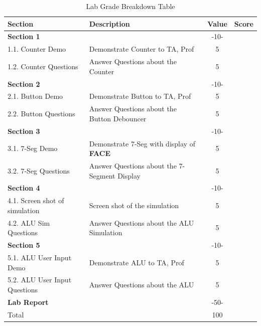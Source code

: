 \documentclass{article}
\begin{document}
\begin{table}[!htb]
  \begin{center}
    \begin{tabular}[width=0.8\textwidth]{|l|l|c|l|}
       \hline
       Section & Description & Value & Score\\
       \hline 
       \multicolumn{2}{|l}{\textbf{Section 1}}  & -10- &\\
       \hline
       1.1. Counter Demo & Demonstrate Counter to TA, Prof & 5 &\\
       1.2. Counter Questions & Answer Questions about the Counter & 5 &\\
       \hline
       \multicolumn{2}{|l}{\textbf{Section 2}}  & -10- &\\
       \hline
       2.1. Button Demo & Demonstrate Button to TA, Prof & 5 &\\
       2.2. Button Questions & Answer Questions about the Button Debouncer & 5 &\\
       \hline
       \multicolumn{2}{|l}{\textbf{Section 3}}  & -10- &\\
       \hline
       3.1. 7-Seg Demo & Demonstrate 7-Seg with display of \textbf{FACE} & 5 &\\
       3.2. 7-Seg Questions & Answer Questions about the 7-Segment Display & 5 &\\
       \hline
       \multicolumn{2}{|l}{\textbf{Section 4}}  & -10- &\\
       \hline
       4.1. Screen shot of simulation &  Screen shot of the simulation & 5 &\\
       4.2. ALU Sim Questions & Answer Questions about the ALU Simulation & 5 &\\
       \hline
       \multicolumn{2}{|l}{\textbf{Section 5}}  & -10- &\\
       \hline
       5.1. ALU User Input Demo & Demonstrate ALU to TA, Prof & 5 &\\
       5.2. ALU User Input Questions & Answer Questions about the ALU & 5 &\\
       \hline
       \multicolumn{2}{|l}{\textbf{Lab Report}}  & -50- &\\
       \hline
       \hline
       \multicolumn{2}{|l}{Total} & \multicolumn{1}{c|}{100} &\\
       \hline
    \end{tabular}
  \end{center}
  \caption{Lab Grade Breakdown Table}
\end{table}
\end{document}
